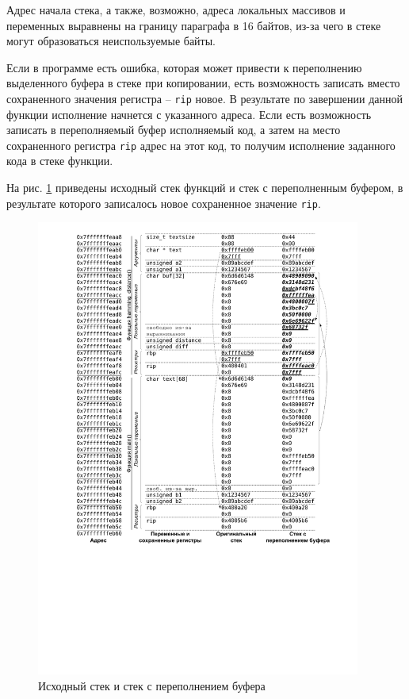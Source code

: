 Адрес начала стека, а также, возможно, адреса локальных массивов и переменных выравнены на границу параграфа в 16 байтов, из-за чего в стеке могут образоваться неиспользуемые байты.

Если в программе есть ошибка, которая может привести к переполнению выделенного буфера в стеке при копировании, есть возможность записать вместо сохраненного значения регистра -- \texttt{rip} новое. В результате по завершении данной функции исполнение начнется с указанного адреса. Если есть возможность записать в переполняемый буфер исполняемый код, а затем на место сохраненного регистра \texttt{rip} адрес на этот код, то получим исполнение заданного кода в стеке функции.

На рис. \ref{fig:stack-overflow} приведены исходный стек функций и стек с переполненным буфером, в результате которого записалось новое сохраненное значение \texttt{rip}.

\begin{figure}[h!]
	\centering
	\includegraphics[width=0.95\textwidth]{pic/stack-overflow}
	\caption{Исходный стек и стек с переполнением буфера\label{fig:stack-overflow}}
\end{figure}


